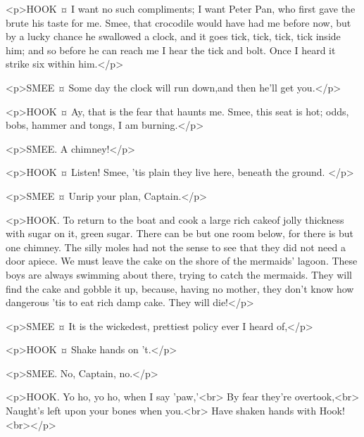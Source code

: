 <p>HOOK ¤
I want no such compliments; I want Peter Pan, who first gave the brute his taste for me. Smee, that crocodile would have had me before now, but by a lucky chance he swallowed a clock, and it goes tick, tick, tick, tick inside him; and so before he can reach me I hear the tick and bolt.
Once I heard it strike six within him.</p>

<p>SMEE ¤
Some day the clock will run down,and then he'll get you.</p>

<p>HOOK ¤
Ay, that is the fear that haunts me.
Smee, this seat is hot; odds, bobs, hammer and tongs, I am burning.</p>


<p>SMEE. A chimney!</p>

<p>HOOK ¤
Listen! Smee, 'tis plain they live here, beneath the ground.
</p>

<p>SMEE ¤
Unrip your plan, Captain.</p>

<p>HOOK. To return to the boat and cook a large rich cakeof jolly thickness with sugar on it, green sugar. There can be but one room below, for there is but one chimney. The silly moles had not the sense to see that they did not need a door apiece. We must leave the cake on the shore of the mermaids' lagoon. These boys are always swimming about there, trying to catch the mermaids. They will find the cake and gobble it up, because, having no mother, they don't know how dangerous 'tis to eat rich damp cake. They will die!</p>

<p>SMEE ¤
It is the wickedest, prettiest policy ever I heard of,</p>

<p>HOOK ¤
Shake hands on 't.</p>

<p>SMEE. No, Captain, no.</p>


<p>HOOK. Yo ho, yo ho, when I say 'paw,'<br> By fear they're overtook,<br> Naught's left upon your bones when you.<br> Have shaken hands with Hook!<br></p>

